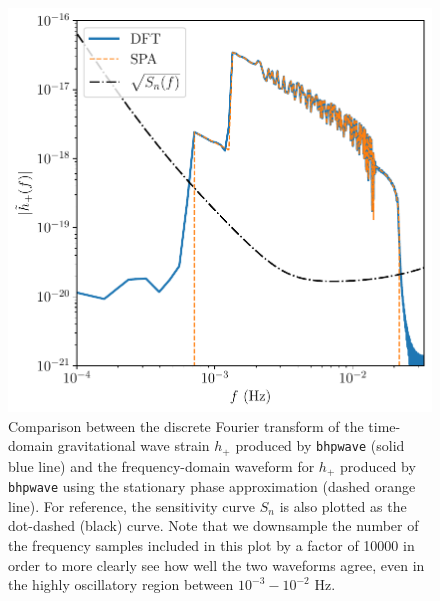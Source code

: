 \documentclass[%
 reprint,
 nofootinbib,
 amsmath,amssymb,
 aps,
 prd,
]{revtex4-2}
\begin{document}
\begin{figure}[!htp]
    \centering
    \includegraphics[width=0.98\linewidth]{figures/dft_comparison.pdf}
    \caption{Comparison between the discrete Fourier transform of the time-domain gravitational wave strain $h_+$ produced by \texttt{bhpwave} (solid blue line) and the frequency-domain waveform for $h_+$ produced by \texttt{bhpwave} using the stationary phase approximation (dashed orange line). For reference, the sensitivity curve $S_n$ is also plotted as the dot-dashed (black) curve. Note that we downsample the number of the frequency samples included in this plot by a factor of 10000 in order to more clearly see how well the two waveforms agree, even in the highly oscillatory region between $10^{-3} - 10^{-2}$ Hz.}
    \label{fig:dft}
\end{figure}
\end{document}
